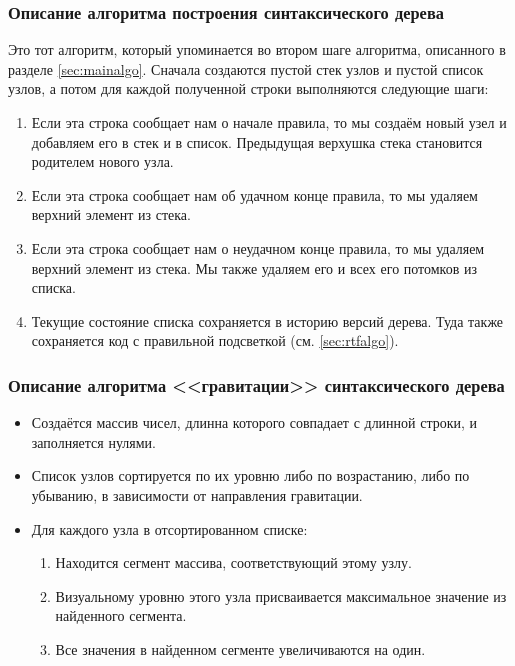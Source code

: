 \documentclass[a4paper,12pt]{article}
\begin{document}
  \subsubsection{Описание алгоритма построения синтаксического дерева}
  \label{sec:treealgo}
  Это тот алгоритм, который упоминается во втором шаге алгоритма, описанного в разделе \ref{sec:mainalgo}.
  Сначала создаются пустой стек узлов и пустой список узлов,
  а потом для каждой полученной строки выполняются следующие шаги:
  \begin{enumerate}
    \item Если эта строка сообщает нам о начале правила, то мы создаём новый узел и добавляем его в стек и в список.
    Предыдущая верхушка стека становится родителем нового узла.
    \item Если эта строка сообщает нам об удачном конце правила, то мы удаляем верхний элемент из стека.
    \item Если эта строка сообщает нам о неудачном конце правила, то мы удаляем верхний элемент из стека.
    Мы также удаляем его и всех его потомков из списка.
    \item Текущие состояние списка сохраняется в историю версий дерева.
    Туда также сохраняется код с правильной подсветкой (см. \autoref{sec:rtfalgo}).
  \end{enumerate}

  \subsubsection{Описание алгоритма <<гравитации>> синтаксического дерева}
  \label{sec:gravalgo}
  \begin{itemize}
    \item Создаётся массив чисел, длинна которого совпадает с длинной строки, и заполняется нулями.
    \item Список узлов сортируется по их уровню либо по возрастанию, либо по убыванию, в зависимости от направления гравитации.
    \item Для каждого узла в отсортированном списке:
    \begin{enumerate}
      \item Находится сегмент массива, соответствующий этому узлу.
      \item Визуальному уровню этого узла присваивается максимальное значение из найденного сегмента.
      \item Все значения в найденном сегменте увеличиваются на один.
    \end{enumerate}
  \end{itemize}
\end{document}
